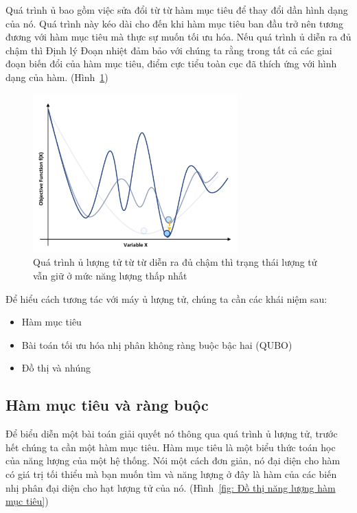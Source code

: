 Quá trình ủ bao gồm việc sửa đổi từ từ hàm mục tiêu để thay đổi dần hình dạng của nó. Quá trình này kéo dài cho đến khi hàm mục tiêu ban đầu trở nên tương đương với hàm mục tiêu mà thực sự muốn tối ưu hóa. 
Nếu quá trình ủ diễn ra đủ chậm thì Định lý Đoạn nhiệt đảm bảo với chúng ta rằng trong tất cả các giai đoạn biến đổi của hàm mục tiêu, điểm cực tiểu toàn cục đã thích ứng với hình dạng của hàm. (Hình~\ref{fig:Biến đổi hàm mục tiêu})

\begin{figure}[h!]
    \centering
    \includegraphics[width=0.7\textwidth]{images/QA.png}
    \caption{Quá trình ủ lượng tử từ từ diễn ra đủ chậm thì trạng thái lượng tử vẫn giữ ở mức năng lượng thấp nhất}
    \label{fig:Biến đổi hàm mục tiêu}
\end{figure}

Để hiểu cách tương tác với máy ủ lượng tử, chúng ta cần các khái niệm sau:

\begin{itemize}
  \item Hàm mục tiêu
  \item Bài toán tối ưu hóa nhị phân không ràng buộc bậc hai (QUBO)
  \item Đồ thị và nhúng
  
\end{itemize}

\subsection{Hàm mục tiêu và ràng buộc}


Để biểu diễn một bài toán giải quyết nó thông qua quá trình ủ lượng tử, trước hết chúng ta cần một hàm mục tiêu. Hàm mục tiêu là một biểu thức toán học của năng lượng của một hệ thống. Nói một cách đơn giản, nó đại diện cho hàm có giá trị tối thiểu mà bạn muốn tìm và năng lượng ở đây là hàm của các biến nhị phân đại diện cho hạt lượng tử của nó. (Hình~\ref{fig: Đồ thị năng lượng hàm mục tiêu})

